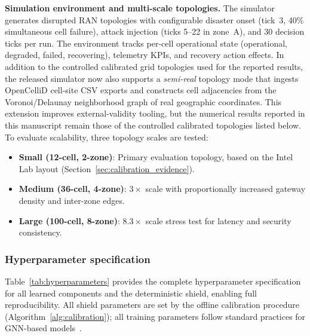 \documentclass[10pt,journal,compsoc]{IEEEtran}
\begin{document}
\noindent\textbf{Simulation environment and multi-scale topologies.}
The simulator generates disrupted RAN topologies with configurable disaster onset (tick~3, 40\% simultaneous cell failure), attack injection (ticks 5--22 in zone~A), and 30 decision ticks per run.
The environment tracks per-cell operational state (operational, degraded, failed, recovering), telemetry KPIs, and recovery action effects.
In addition to the controlled calibrated grid topologies used for the reported results, the released simulator now also supports a \emph{semi-real} topology mode that ingests OpenCelliD cell-site CSV exports and constructs cell adjacencies from the Voronoi/Delaunay neighborhood graph of real geographic coordinates.
This extension improves external-validity tooling, but the numerical results reported in this manuscript remain those of the controlled calibrated topologies listed below.
To evaluate scalability, three topology scales are tested:
\begin{itemize}
    \item \textbf{Small (12-cell, 2-zone)}: Primary evaluation topology, based on the Intel Lab layout (Section~\ref{sec:calibration_evidence}).
    \item \textbf{Medium (36-cell, 4-zone)}: $3\times$ scale with proportionally increased gateway density and inter-zone edges.
    \item \textbf{Large (100-cell, 8-zone)}: $8.3\times$ scale stress test for latency and security consistency.
\end{itemize}

\subsubsection{Hyperparameter specification}
\label{sec:hyperparameters}
Table~\ref{tab:hyperparameters} provides the complete hyperparameter specification for all learned components and the deterministic shield, enabling full reproducibility.
All shield parameters are set by the offline calibration procedure (Algorithm~\ref{alg:calibration}); all training parameters follow standard practices for GNN-based models~\cite{hamilton2017graphsage,fey2019pyg}.
\end{document}
